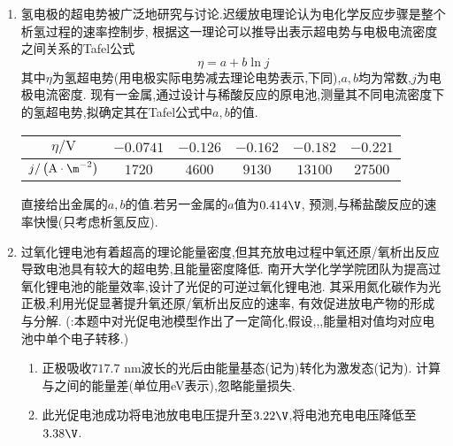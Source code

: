 \documentclass{ctexart}
\begin{document}
\begin{problem}
    \begin{enumerate}[label=\tbf{\arabic{Pcounter}-\arabic*},topsep=0pt,parsep=0pt,itemsep=0pt,partopsep=0pt]
        \item 氢电极的超电势被广泛地研究与讨论.迟缓放电理论认为电化学反应步骤是整个析氢过程的速率控制步,%
            根据这一理论可以推导出表示超电势与电极电流密度之间关系的Tafel公式
            \[\eta=a+b\ln j\]
            其中$\eta$为氢超电势(用电极实际电势减去理论电势表示,下同),$a,b$均为常数,$j$为电极电流密度.%
            现有一金属,通过设计与稀酸反应的原电池,测量其不同电流密度下的氢超电势,拟确定其在Tafel公式中$a,b$的值.
            \vspace{-5pt}\begin{table}[H]\centering
            \begin{tabular}{|c|c|c|c|c|c|}
            \hline $\eta/\text{V}$ 
            & $-0.0741$ & $-0.126$  & $-0.162$  & $-0.182$  & $-0.221$ \\
            \hline $j/\left(\text{A}\cdot\m^{-2}\right)$
            & $1720$    & $4600$    & $9130$    & $13100$   & $27500$ \\\hline
            \end{tabular}
            \end{table}\vspace{-15pt}
            直接给出金属的$a,b$的值.若另一金属的$a$值为$0.414\V$,%
            预测,与稀盐酸反应的速率快慢(只考虑析氢反应).
        \item 过氧化锂电池有着超高的理论能量密度,但其充放电过程中氧还原/氧析出反应导致电池具有较大的超电势,且能量密度降低.%
            南开大学化学学院团队为提高过氧化锂电池的能量效率,设计了光促的可逆过氧化锂电池.%
            其采用氮化碳作为光正极,利用光促显著提升氧还原/氧析出反应的速率,%
            有效促进放电产物的形成与分解.%
            (:本题中对光促电池模型作出了一定简化,假设,,,能量相对值均对应电池中单个电子转移.)
            \begin{enumerate}[label=\tbf{\arabic{Pcounter}-2-\arabic*},topsep=0pt,parsep=0pt,itemsep=0pt,partopsep=0pt,leftmargin=10pt]
                \item 正极吸收$717.7\text{ nm}$波长的光后由能量基态(记为)转化为激发态(记为).%
                    计算与之间的能量差(单位用eV表示),忽略能量损失.
                \item 此光促电池成功将电池放电电压提升至$3.22\V$,将电池充电电压降低至$3.38\V$.%

\end{enumerate}
\end{enumerate}
\end{problem}
\end{document}
